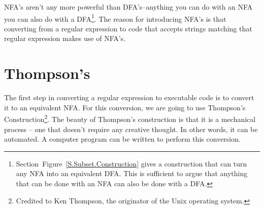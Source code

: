 \documentclass[letterpaper,12pt,openany,reqno]{book}%
\begin{document}
NFA's aren't any more powerful than DFA's--anything you can do with an NFA you can also do with a DFA\footnote{Section~Figure~\ref{S.Subset.Construction} gives a construction that can turn any NFA into an equivalent DFA. This is sufficient to argue that anything that can be done with an NFA can also be done with a DFA.}. The reason for introducing NFA's is that converting from a regular expression to code that accepts strings matching that regular expression makes use of NFA's.

\section{Thompson's}

The first step in converting a regular expression to executable code is to convert it to an equivalent NFA. For this conversion, we are going to use Thompson's Construction\footnote{Credited to Ken Thompson, the originator of the Unix operating system.}. The beauty of Thompson's construction is that it is a mechanical process -- one that doesn't require any creative thought. In other words, it can be automated. A computer program can be written to perform this conversion.
\end{document}
